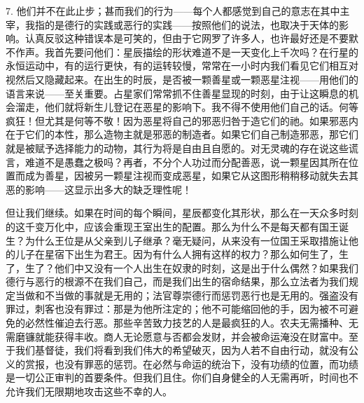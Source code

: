 7. 他们并不在此止步；甚而我们的行为——每个人都感觉到自己的意志在其中主宰，我指的是德行的实践或恶行的实践——按照他们的说法，也取决于天体的影响。认真反驳这种错误本是可笑的，但由于它网罗了许多人，也许最好还是不要默不作声。我首先要问他们：星辰描绘的形状难道不是一天变化上千次吗？在行星的永恒运动中，有的运行更快，有的运转较慢，常常在一小时内我们看见它们相互对视然后又隐藏起来。在出生的时辰，是否被一颗善星或一颗恶星注视——用他们的语言来说——至关重要。占星家们常常抓不住善星显现的时刻，由于让这瞬息的机会溜走，他们就将新生儿登记在恶星的影响下。我不得不使用他们自己的话。何等疯狂！但尤其是何等不敬！因为恶星将自己的邪恶归咎于造它们的祂。如果邪恶内在于它们的本性，那么造物主就是邪恶的制造者。如果它们自己制造邪恶，那它们就是被赋予选择能力的动物，其行为将是自由且自愿的。对无灵魂的存在说这些谎言，难道不是愚蠢之极吗？再者，不分个人功过而分配善恶，说一颗星因其所在位置而成为善星，因被另一颗星注视而变成恶星，如果它从这图形稍稍移动就失去其恶的影响——这显示出多大的缺乏理性呢！\par

但让我们继续。如果在时间的每个瞬间，星辰都变化其形状，那么在一天众多时刻的这千变万化中，应该会重现王室出生的配置。那么为什么不是每天都有国王诞生？为什么王位是从父亲到儿子继承？毫无疑问，从来没有一位国王采取措施让他的儿子在星宿下出生为君王。因为有什么人拥有这样的权力？那么如何生了，生了，生了？他们中又没有一个人出生在奴隶的时刻，这是出于什么偶然？如果我们德行与恶行的根源不在我们自己，而是我们出生的宿命结果，那么立法者为我们规定当做和不当做的事就是无用的；法官尊崇德行而惩罚恶行也是无用的。强盗没有罪过，刺客也没有罪过：那是为他所注定的；他不可能缩回他的手，因为被不可避免的必然性催迫去行恶。那些辛苦致力技艺的人是最疯狂的人。农夫无需播种、无需磨镰就能获得丰收。商人无论愿意与否都会发财，并会被命运淹没在财富中。至于我们基督徒，我们将看到我们伟大的希望破灭，因为人若不自由行动，就没有公义的赏报，也没有罪恶的惩罚。在必然与命运的统治下，没有功绩的位置，而功绩是一切公正审判的首要条件。但我们且住。你们自身健全的人无需再听，时间也不允许我们无限期地攻击这些不幸的人。\par

